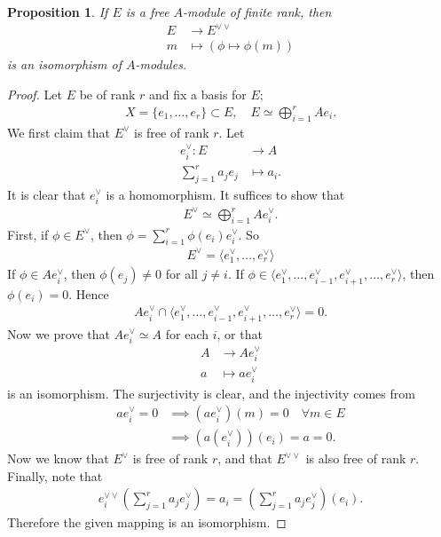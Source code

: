 \documentclass[12pt]{report}
\theoremstyle{plain}
\newtheorem{proposition}[theorem]{Proposition}
\theoremstyle{remark}
\theoremstyle{definition}
\begin{document}
\begin{proposition}
    If $E$ is a free $A$-module of finite rank, then
    \begin{align*}
        E&\rightarrow E^{\vee\vee} \\
        m&\mapsto (\phi\mapsto \phi(m))
    \end{align*}
    is an isomorphism of $A$-modules.
\end{proposition}
\begin{proof}
    Let $E$ be of rank $r$ and fix a basis for $E$;
    \begin{align*}
        X=\{e_1,\dots,e_r\}\subset E,\quad E\simeq \bigoplus_{i=1}^r Ae_i.
    \end{align*}
    We first claim that $E^\vee$ is free of rank $r$. Let
    \begin{align*}
        e_i^\vee : E&\rightarrow A \\
        \sum_{j=1}^r a_je_j &\mapsto a_i.
    \end{align*}
    It is clear that $e_i^\vee$ is a homomorphism. It suffices to show that
    \begin{align*}
        E^\vee\simeq \bigoplus_{i=1}^r Ae_i^\vee.
    \end{align*}
    First, if $\phi\in E^\vee$, then $\phi=\sum_{i=1}^r \phi(e_i)e_i^\vee$. So
    \begin{align*}
        E^\vee=\langle e_1^\vee,\dots,e_r^\vee\rangle
    \end{align*}
    If $\phi\in Ae_i^\vee$, then $\phi(e_j)\neq 0$ for all $j\neq i$. If $\phi\in \langle e_1^\vee,\dots,e_{i-1}^\vee,e_{i+1}^\vee,\dots,e_r^\vee\rangle$, then $\phi(e_i)=0$. Hence
    \begin{align*}
        Ae_i^\vee \cap \langle e_1^\vee,\dots,e_{i-1}^\vee,e_{i+1}^\vee,\dots,e_r^\vee\rangle = 0.
    \end{align*}
    Now we prove that $Ae_i^\vee\simeq A$ for each $i$, or that
    \begin{align*}
        A&\rightarrow Ae_i^\vee \\
        a&\mapsto ae_i^\vee
    \end{align*}
    is an isomorphism. The surjectivity is clear, and the injectivity comes from
    \begin{align*}
        ae_i^\vee =0 &\implies (ae_i^\vee)(m)=0\quad \forall m\in E \\
        &\implies (a(e_i^\vee))(e_i) = a=0.
    \end{align*}
    Now we know that $E^\vee$ is free of rank $r$, and that $E^{\vee\vee}$ is also free of rank $r$. Finally, note that
    \begin{align*}
        e_i^{\vee\vee}\left( \sum_{j=1}^r a_j e_j^\vee \right) = a_i = \left( \sum_{j=1}^r a_j e_j^\vee \right)(e_i).
    \end{align*}
    Therefore the given mapping is an isomorphism.
\end{proof}
\end{document}
